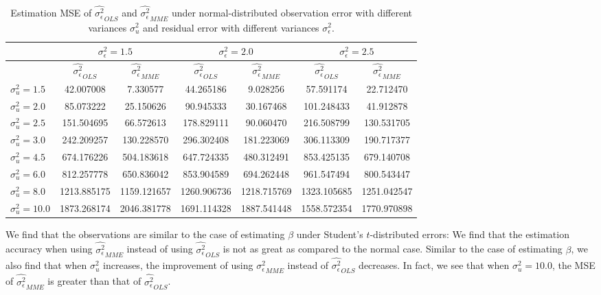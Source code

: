\documentclass{article}
\begin{document}
\begin{table}[ht]
    \centering
    \caption{Estimation MSE of $\hat{\sigma^2_\epsilon}_{OLS}$ and $\hat{\sigma^2_\epsilon}_{MME}$ under normal-distributed observation error with different variances $\sigma^2_u$ and residual error with different variances $\sigma^2_\epsilon$.}
    \label{Tab:MSE_sigma_t}
    \begin{tabular}[t]{lcccccc}
        \hline
        &\multicolumn{2}{c}{$\sigma^2_\epsilon=1.5$}&\multicolumn{2}{c}{$\sigma^2_\epsilon=2.0$}&\multicolumn{2}{c}{$\sigma^2_\epsilon=2.5$}\\
        \hline
        &$\hat{\sigma^2_\epsilon}_{OLS}$&$\hat{\sigma^2_\epsilon}_{MME}$&$\hat{\sigma^2_\epsilon}_{OLS}$&
        $\hat{\sigma^2_\epsilon}_{MME}$&$\hat{\sigma^2_\epsilon}_{OLS}$&$\hat{\sigma^2_\epsilon}_{MME}$\\
        \hline
        $\sigma^2_u = 1.5$&42.007008&7.330577&44.265186&9.028256&57.591174&22.712470\\
        $\sigma^2_u = 2.0$&85.073222&25.150626&90.945333&30.167468&101.248433&41.912878\\
        $\sigma^2_u = 2.5$&151.504695&66.572613&178.829111&90.060470&216.508799&130.531705\\
        $\sigma^2_u = 3.0$&242.209257&130.228570&296.302408&181.223069&306.113309&190.717377\\
        $\sigma^2_u = 4.5$&674.176226&504.183618&647.724335&480.312491&853.425135&679.140708\\
        $\sigma^2_u = 6.0$&812.257778&650.836042&853.904589&694.262448&961.547494&800.543447\\
        $\sigma^2_u = 8.0$&1213.885175&1159.121657&1260.906736&1218.715769&1323.105685&1251.042547\\
        $\sigma^2_u = 10.0$&1873.268174&2046.381778&1691.114328&1887.541448&1558.572354&1770.970898\\
        \hline
    \end{tabular}
\end{table}

We find that the observations are similar to the case of estimating $\beta$ under Student's $t$-distributed errors: 
We find that the estimation accuracy when using $\hat{\sigma^2_\epsilon}_{MME}$ instead of using $\hat{\sigma^2_\epsilon}_{OLS}$ is not as great as compared to the normal case.
Similar to the case of estimating $\beta$, we also find that when $\sigma^2_u$ increases, the improvement of using $\hat{\sigma^2_\epsilon}_{MME}$ instead of $\hat{\sigma^2_\epsilon}_{OLS}$ decreases.
In fact, we see that when $\sigma^2_u = 10.0$, the MSE of $\hat{\sigma^2_\epsilon}_{MME}$ is greater than that of $\hat{\sigma^2_\epsilon}_{OLS}$. 
\end{document}
